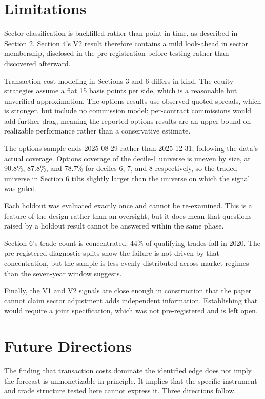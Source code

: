 \documentclass[11pt]{article}
\begin{document}
\section{Limitations}

Sector classification is backfilled rather than point-in-time, as described in Section 2. Section 4's V2 result therefore contains a mild look-ahead in sector membership, disclosed in the pre-registration before testing rather than discovered afterward.

Transaction cost modeling in Sections 3 and 6 differs in kind. The equity strategies assume a flat 15 basis points per side, which is a reasonable but unverified approximation. The options results use observed quoted spreads, which is stronger, but include no commission model; per-contract commissions would add further drag, meaning the reported options results are an upper bound on realizable performance rather than a conservative estimate.

The options sample ends 2025-08-29 rather than 2025-12-31, following the data's actual coverage. Options coverage of the decile-1 universe is uneven by size, at 90.8\%, 87.8\%, and 78.7\% for deciles 6, 7, and 8 respectively, so the traded universe in Section 6 tilts slightly larger than the universe on which the signal was gated.

Each holdout was evaluated exactly once and cannot be re-examined. This is a feature of the design rather than an oversight, but it does mean that questions raised by a holdout result cannot be answered within the same phase.

Section 6's trade count is concentrated: 44\% of qualifying trades fall in 2020. The pre-registered diagnostic splits show the failure is not driven by that concentration, but the sample is less evenly distributed across market regimes than the seven-year window suggests.

Finally, the V1 and V2 signals are close enough in construction that the paper cannot claim sector adjustment adds independent information. Establishing that would require a joint specification, which was not pre-registered and is left open.

\section{Future Directions}

The finding that transaction costs dominate the identified edge does not imply the forecast is unmonetizable in principle. It implies that the specific instrument and trade structure tested here cannot express it. Three directions follow.
\end{document}
